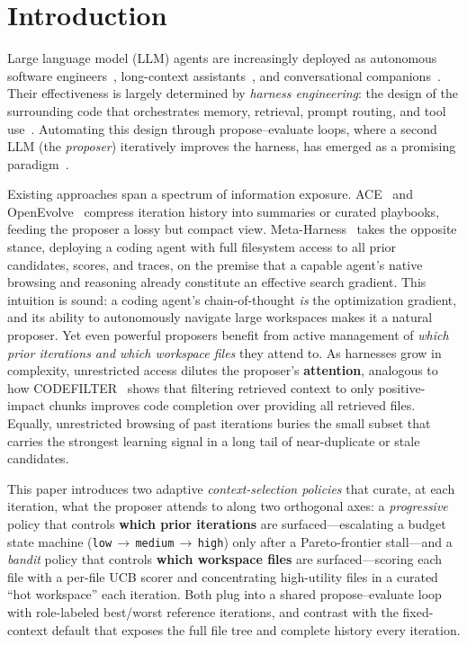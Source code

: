 \section{Introduction}
\label{sec:intro}

Large language model (LLM) agents are increasingly deployed as autonomous
software engineers~\cite{jimenez2024swebench,yang2024sweagent}, long-context
assistants~\cite{wu2024longmemeval}, and conversational
companions~\cite{maharana2024locomo}. Their effectiveness is largely
determined by \emph{harness engineering}: the design of the surrounding
code that orchestrates memory, retrieval, prompt routing, and tool
use~\cite{lee2026metaharness}. Automating this design through
propose--evaluate loops, where a second LLM (the \emph{proposer})
iteratively improves the harness, has emerged as a promising
paradigm~\cite{hu2024adas,khattab2023dspy}.

Existing approaches span a spectrum of information exposure.
ACE~\cite{zhang2025ace} and OpenEvolve~\cite{sharma2025openevolve}
compress iteration history into summaries or curated playbooks, feeding
the proposer a lossy but compact view.
Meta-Harness~\cite{lee2026metaharness} takes the opposite stance,
deploying a coding agent with full filesystem access to all prior
candidates, scores, and traces, on the premise that a capable agent's
native browsing and reasoning already constitute an effective search
gradient. This intuition is sound: a coding agent's chain-of-thought
\emph{is} the optimization gradient, and its ability to autonomously
navigate large workspaces makes it a natural proposer. Yet even powerful
proposers benefit from active management of \emph{which prior
iterations and which workspace files} they attend to. As harnesses grow
in complexity, unrestricted access dilutes the proposer's
\textbf{attention}, analogous to how CODEFILTER~\cite{li2025codefilter}
shows that filtering retrieved context to only positive-impact chunks
improves code completion over providing all retrieved files. Equally,
unrestricted browsing of past iterations buries the small subset that
carries the strongest learning signal in a long tail of near-duplicate
or stale candidates.

This paper introduces two adaptive \emph{context-selection policies}
that curate, at each iteration, what the proposer attends to along two
orthogonal axes: a \emph{progressive} policy that controls
\textbf{which prior iterations} are surfaced---escalating a budget
state machine
(\texttt{low}$\,\to\,$\texttt{medium}$\,\to\,$\texttt{high}) only after
a Pareto-frontier stall---and a \emph{bandit} policy that controls
\textbf{which workspace files} are surfaced---scoring each file with a
per-file UCB scorer and concentrating high-utility files in a curated
``hot workspace'' each iteration. Both plug into a shared
propose--evaluate loop with role-labeled best/worst reference
iterations, and contrast with the fixed-context default that exposes
the full file tree and complete history every iteration.

